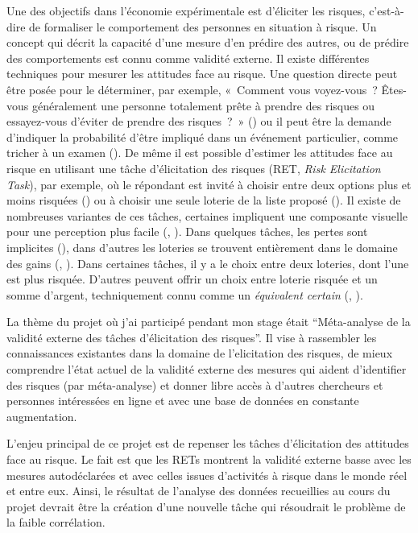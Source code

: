 \documentclass[12pt]{article}
\begin{document}
Une des objectifs dans l'économie expérimentale est d'éliciter les
risques, c'est-à-dire de formaliser le comportement des personnes en
situation à risque. Un concept qui décrit la capacité d'une mesure d'en
prédire des autres, ou de prédire des comportements est connu comme
validité externe. Il existe différentes techniques pour mesurer les
attitudes face au risque. Une question directe peut être posée pour le
déterminer, par exemple, «~Comment vous voyez-vous~? Êtes-vous
généralement une personne totalement prête à prendre des risques ou
essayez-vous d'éviter de prendre des risques~?~» (\citet{SOEP2007}) ou
il peut être la demande d'indiquer la probabilité d'être impliqué dans
un événement particulier, comme tricher à un examen (\citet{Blais2006}).
De même il est possible d'estimer les attitudes face au risque en
utilisant une tâche d'élicitation des risques (RET, \emph{Risk
Elicitation Task}), par exemple, où le répondant est invité à choisir
entre deux options plus et moins risquées (\citet{Holt2002}) ou à
choisir une seule loterie de la liste proposé (\citet{Eckel2002}). Il
existe de nombreuses variantes de ces tâches, certaines impliquent une
composante visuelle pour une perception plus facile (\citet{Lejuez2002},
\citet{Crosetto2013}). Dans quelques tâches, les pertes sont implicites
(\citet{Menkhoff_Sakha_2017}), dans d'autres les loteries se trouvent
entièrement dans le domaine des gains (\citet{Eckel2002},
\citet{Holt2002}). Dans certaines tâches, il y a le choix entre deux
loteries, dont l'une est plus risquée. D'autres peuvent offrir un choix
entre loterie risquée et un somme d'argent, techniquement connu comme un
\emph{équivalent certain} (\citet{Menkhoff_Sakha_2017},
\citet{Csermely2014}).

La thème du projet où j'ai participé pendant mon stage était
``Méta-analyse de la validité externe des tâches d'élicitation des
risques''. Il vise à rassembler les connaissances existantes dans la
domaine de l'elicitation des risques, de mieux comprendre l'état actuel
de la validité externe des mesures qui aident d'identifier des risques
(par méta-analyse) et donner libre accès à d'autres chercheurs et
personnes intéressées en ligne et avec une base de données en constante
augmentation.

L'enjeu principal de ce projet est de repenser les tâches d'élicitation
des attitudes face au risque. Le fait est que les RETs montrent la
validité externe basse avec les mesures autodéclarées et avec celles
issues d'activités à risque dans le monde réel et entre eux. Ainsi, le
résultat de l'analyse des données recueillies au cours du projet devrait
être la création d'une nouvelle tâche qui résoudrait le problème de la
faible corrélation.
\end{document}
